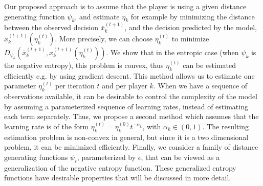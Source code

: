 \documentclass{sig-alternate-ipsn13}
\begin{document}
Our proposed approach is to assume that the player is using a given distance generating function $\psi_k$, and estimate $\eta_k$ for example by minimizing the distance between the observed decision $\bar x^{(t+1)}_k$, and the decision predicted by the model, $x^{(t+1)}_k(\eta_k^{(t)})$. More precisely, we can choose $\eta^{(t)}_k$ to minimize $D_{\psi_k}(\bar x^{(t+1)}_k, x^{(t+1)}_k(\eta_k^{(t)}))$. We show that in the entropic case (when $\psi_k$ is the negative entropy), this problem is convex, thus $\eta_k^{(t)}$ can be estimated efficiently e.g. by using gradient descent. This method allows us to estimate one parameter $\eta_k^{(t)}$ per iteration $t$ and per player $k$. When we have a sequence of observations available, it can be desirable to control the complexity of the model by assuming a parameterized sequence of learning rates, instead of estimating each term separately. Thus, we propose a second method which assumes that the learning rate is of the form $\eta^{(t)}_k = \eta^{(0)}_k t^{-\alpha_k}$, with $\alpha_k \in (0, 1)$. The resulting estimation problem is non-convex in general, but since it is a two dimensional problem, it can be minimized efficiently. Finally, we consider a family of distance generating functions $\psi_\epsilon$, parameterized by $\epsilon$, that can be viewed as a generalization of the negative entropy function. These generalized entropy functions have desirable properties that will be discussed in more detail.
\end{document}
